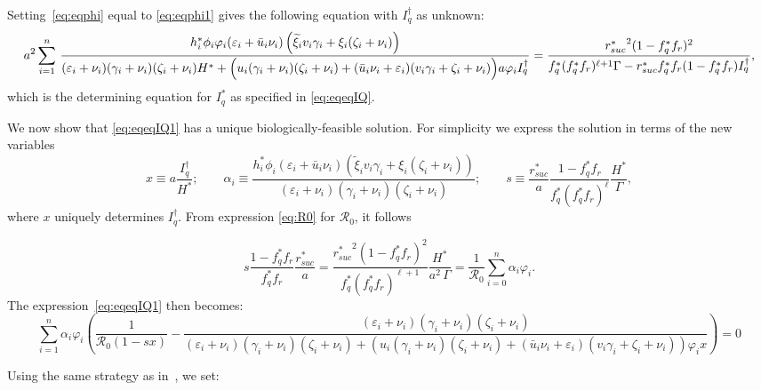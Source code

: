 \documentclass[a4paper]{article}
\newcommand{\dsum}{\displaystyle\sum}
\newcommand{\varpiVar}{r_{suc}}
\newcommand{\miVar}{\varphi_i}
\begin{document}
Setting~\eqref{eq:eqphi} equal to \eqref{eq:eqphi1} gives  the following equation with $I^\dagger _q$ as unknown: \begin{equation}\label{eq:eqeqIQ1}\small a^2\dsum_{i=1}^n\, \frac{h_i^*\phi_i\varphi_i (\varepsilon_i+\bar u_i\nu_i)\left(\widetilde\xi_iv_i\gamma_i+\xi_i(\zeta_i+\nu_i)\right)}{ (\varepsilon_i+\nu_i)(\gamma_i+\nu_i)(\zeta_i+\nu_i)H^* + \Big(u_i(\gamma_i+\nu_i)(\zeta_i+\nu_i) + (\bar u_i\nu_i+\varepsilon_i)(v_i\gamma_i + \zeta_i+\nu_i) \Big)a\varphi_i I^\dagger_q}
=\dfrac{{\varpiVar ^*}^2(1-f^*_qf_r)^2 }{f^*_q(f^*_qf_r)^{\ell+1}\Gamma-\varpiVar ^* f^*_qf_r (1-f^*_qf_r)I_q^\dagger },
\end{equation}
which is the determining equation for $I_q^*$ as specified in \eqref{eq:eqeqIQ}.

We now show that \eqref{eq:eqeqIQ1} has a unique biologically-feasible solution. For simplicity we express the solution in terms of the new variables 
\begin{equation}\label{eq:xdef}
x \equiv a\frac{I^\dagger_q}{H^*}; \qquad
\alpha_i \equiv \dfrac{h_i^*\phi_i (\varepsilon_i + \bar u_i\nu_i)\left(\widetilde\xi_iv_i\gamma_i +\xi_i(\zeta_i+\nu_i)\right)}{(\varepsilon_i+\nu_i)(\gamma_i+\nu_i)(\zeta_i+\nu_i)}; \qquad s \equiv \frac{\varpiVar ^*}{a}\frac{1-f^*_qf_r}{f^*_q(f^*_qf_r)^\ell}\frac{H^*}{\Gamma},
\end{equation}
where $x$ uniquely determines $I^\dagger _q$.  
From expression \eqref{eq:R0} for $\mathcal R_0$, it follows

\begin{equation}\label{eq:eqrelpo}s\dfrac{1-f^*_qf_r}{f^*_qf_r}\dfrac{\varpiVar ^*}{a}=\dfrac{{\varpiVar ^*}^2(1-f^*_qf_r)^2}{f^*_q(f^*_qf_r)^{\ell+1}}\dfrac{H^*}{a^2\,\Gamma}=\frac{1}{\mathcal R_0}\dsum_{i=0}^{n}\alpha_i \varphi_i.\end{equation}
The expression~\eqref{eq:eqeqIQ1} then becomes:
\begin{equation}\label{eq:eqeqIQnew}\dsum_{i=1}^{n}\alpha_i \miVar\left(\dfrac{1}{\mathcal R_0 (1-sx)}-\frac{(\varepsilon_i+\nu_i)(\gamma_i+\nu_i)(\zeta_i+\nu_i)}{(\varepsilon_i+\nu_i)(\gamma_i+\nu_i)(\zeta_i+\nu_i) + \left(u_i(\gamma_i+\nu_i)(\zeta_i+\nu_i) + (\bar u_i\nu_i+\varepsilon_i)(v_i\gamma_i + \zeta_i+\nu_i) \right)\varphi_i x} \right)=0\end{equation}

\noindent Using the same strategy as in~\cite{jckam201411}, we set:

\end{document}
